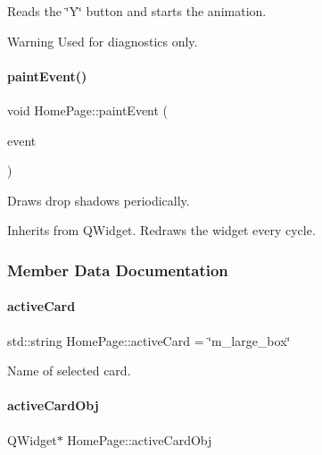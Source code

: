 Reads the \char`\"{}\+Y\char`\"{} button and starts the animation. \begin{DoxyWarning}{Warning}
Used for diagnostics only. 
\end{DoxyWarning}
\mbox{\label{classHomePage_ab3daab17f753e46efcec8968333f88b5}} 
\paragraph{\texorpdfstring{paintEvent()}{paintEvent()}}
{\footnotesize\ttfamily void Home\+Page\+::paint\+Event (\begin{DoxyParamCaption}\item[{Q\+Paint\+Event $\ast$}]{event }\end{DoxyParamCaption})\hspace{0.3cm}{\ttfamily [protected]}}

Draws drop shadows periodically.

Inherits from Q\+Widget. Redraws the widget every cycle. 

\subsubsection{Member Data Documentation}
\mbox{\label{classHomePage_aa62987c2e8b75ca00ae5967870670bd4}} 
\paragraph{\texorpdfstring{activeCard}{activeCard}}
{\footnotesize\ttfamily std\+::string Home\+Page\+::active\+Card = \char`\"{}m\+\_\+large\+\_\+box\char`\"{}\hspace{0.3cm}{\ttfamily [private]}}



Name of selected card. 

\mbox{\label{classHomePage_a36a25c775874418af5e2777c91c3393e}} 
\paragraph{\texorpdfstring{activeCardObj}{activeCardObj}}
{\footnotesize\ttfamily Q\+Widget$\ast$ Home\+Page\+::active\+Card\+Obj\hspace{0.3cm}{\ttfamily [private]}}



